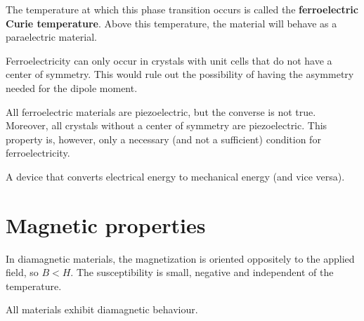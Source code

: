     The temperature at which this phase transition occurs is called the \textbf{ferroelectric Curie temperature}. Above this temperature, the material will behave as a paraelectric material.

   \begin{remark}
       Ferroelectricity can only occur in crystals with unit cells that do not have a center of symmetry. This would rule out the possibility of having the asymmetry needed for the dipole moment.
   \end{remark}


    \begin{remark}
        All ferroelectric materials are piezoelectric, but the converse is not true. Moreover, all crystals without a center of symmetry are piezoelectric. This property is, however, only a necessary (and not a sufficient) condition for ferroelectricity.
    \end{remark}

    \begin{example}[Transducer]
        A device that converts electrical energy to mechanical energy (and vice versa).
    \end{example}

\section{Magnetic properties}

    \begin{definition}[Diamagnetism]
        In diamagnetic materials, the magnetization is oriented oppositely to the applied field, so $B<H$. The susceptibility is small, negative and independent of the temperature.
    \end{definition}
    \begin{remark}
        All materials exhibit diamagnetic behaviour.
    \end{remark}

